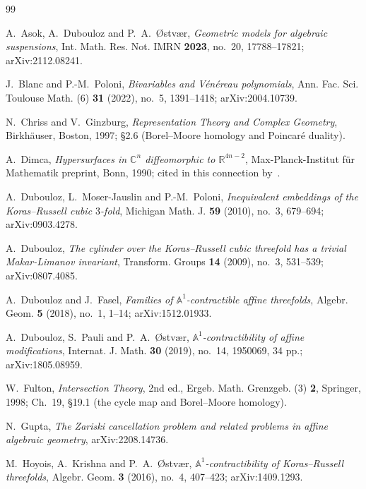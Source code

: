 \documentclass[11pt]{article}
\theoremstyle{definition}
\theoremstyle{remark}
\newcommand{\C}{\mathbb{C}}
\begin{document}
\begin{thebibliography}{99}

A.~Asok, A.~Dubouloz and P.~A.~{\O}stv{\ae}r, \emph{Geometric models for
algebraic suspensions}, Int. Math. Res. Not. IMRN \textbf{2023}, no.~20,
17788--17821; arXiv:2112.08241.

J.~Blanc and P.-M.~Poloni, \emph{Bivariables and V\'en\'ereau polynomials},
Ann. Fac. Sci. Toulouse Math. (6) \textbf{31} (2022), no.~5, 1391--1418;
arXiv:2004.10739.

N.~Chriss and V.~Ginzburg, \emph{Representation Theory and Complex Geometry},
Birkh\"auser, Boston, 1997; \S2.6 (Borel--Moore homology and Poincar\'e
duality).

A.~Dimca, \emph{Hypersurfaces in $\C^n$ diffeomorphic to $\mathbb{R}^{4n-2}$},
Max-Planck-Institut f\"ur Mathematik preprint, Bonn, 1990; cited in this
connection by~\cite{DMJP2009}.

A.~Dubouloz, L.~Moser-Jauslin and P.-M.~Poloni, \emph{Inequivalent embeddings
of the Koras--Russell cubic $3$-fold}, Michigan Math. J. \textbf{59} (2010),
no.~3, 679--694; arXiv:0903.4278.

A.~Dubouloz, \emph{The cylinder over the Koras--Russell cubic threefold has a
trivial Makar-Limanov invariant}, Transform. Groups \textbf{14} (2009), no.~3,
531--539; arXiv:0807.4085.

A.~Dubouloz and J.~Fasel, \emph{Families of $\mathbb{A}^1$-contractible affine
threefolds}, Algebr. Geom. \textbf{5} (2018), no.~1, 1--14; arXiv:1512.01933.

A.~Dubouloz, S.~Pauli and P.~A.~{\O}stv{\ae}r,
\emph{$\mathbb{A}^1$-contractibility of affine modifications}, Internat. J.
Math. \textbf{30} (2019), no.~14, 1950069, 34 pp.; arXiv:1805.08959.

W.~Fulton, \emph{Intersection Theory}, 2nd ed., Ergeb. Math. Grenzgeb. (3)
\textbf{2}, Springer, 1998; Ch.~19, \S19.1 (the cycle map and Borel--Moore
homology).

N.~Gupta, \emph{The Zariski cancellation problem and related problems in
affine algebraic geometry}, arXiv:2208.14736.

M.~Hoyois, A.~Krishna and P.~A.~{\O}stv{\ae}r,
\emph{$\mathbb{A}^1$-contractibility of Koras--Russell threefolds}, Algebr.
Geom. \textbf{3} (2016), no.~4, 407--423; arXiv:1409.1293.


\end{thebibliography}
\end{document}
